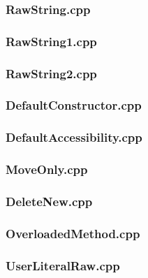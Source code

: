 \documentclass[11pt,]{report}
\begin{document}
\begin{appendix}
\subsubsection{RawString.cpp}
\label{sub:RawString}


\subsubsection{RawString1.cpp}
\label{sub:RawString1}


\subsubsection{RawString2.cpp}
\label{sub:RawString2}


\subsubsection{DefaultConstructor.cpp}
\label{sub:DefaultConstructor}


\subsubsection{DefaultAccessibility.cpp}
\label{sub:DefaultAccessibility}


\subsubsection{MoveOnly.cpp}
\label{sub:MoveOnly}


\subsubsection{DeleteNew.cpp}
\label{sub:DeleteNew}


\subsubsection{OverloadedMethod.cpp}
\label{sub:OverloadedMethod.cpp}


\subsubsection{UserLiteralRaw.cpp}
\label{sub:UserLiteralRaw.cpp}


\end{appendix}
\end{document}
